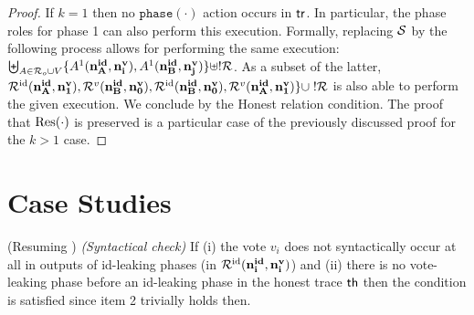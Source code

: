 \begin{proof}
If $k=1$ then no $\mathtt{phase}(\cdot)$ action occurs in $\tr$.
In particular, the phase roles for phase 1 can also perform this execution.
Formally, replacing $\S$ by the following process allows for performing the same execution:
$\biguplus_{A\in\roles_o\cup V}
  \{A^1(\nID{A},\nV{i}),
    A^1(\nID{B},\nV{j})\}\uplus !\roles$.
As a subset of the latter,
$\roles^\id(\nID{A},\nV{1}),
\roles^v(\nID{B},\nV{0}),
\roles^\id(\nID{B},\nV{0}),
\roles^v(\nID{A},\nV{1})
\}\cup\;!\roles$
is also able to perform the given execution.
We conclude by the Honest relation condition.
The proof that $\Res(\cdot)$ is preserved
is a particular case of the previously discussed proof for the
$k>1$ case.
\end{proof}



\section{Case Studies}
\label{ap:caseStudies}
(Resuming )
\textit{(Syntactical check)}
If (i) the vote $v_i$ does not syntactically occur at all in outputs of id-leaking phases (\ie in $\roles^\id(\nID{i},\nV{i})$)
and (ii) there is no vote-leaking phase before an id-leaking phase in the honest trace $\th$
then the condition is satisfied since item 2 trivially holds then.


